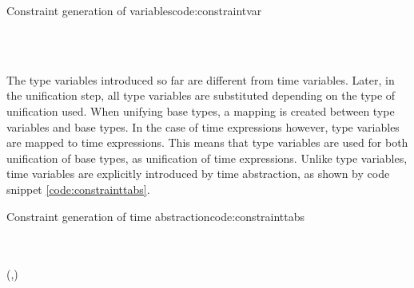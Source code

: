 \begin{texexptitled}{Constraint generation of variables}{code:constraintvar}
\begin{hscode}\SaveRestoreHook
{}%
%
%
%
%
%
\>[5]{}\;\to {}\<[E]%
\\
\>[5]{}\<[9]%
\>[9]{}\;{}\<[13]%
\>[13]{}\<[21]%
\>[21]{}\leftarrow{}\;\;\<[E]%
\\
\>[13]{}\;\<[E]%
\ColumnHook
\end{hscode}\resethooks
\end{texexptitled}

The type variables introduced so far are different from time variables.
Later, in the unification step, all type variables are substituted depending on the type of unification used.
When unifying base types, a mapping is created between type variables and base types.
In the case of time expressions however, type variables are mapped to time expressions.
This means that type variables are used for both unification of base types, as unification of time expressions.
Unlike type variables, time variables are explicitly introduced by time abstraction, as shown by code snippet \ref{code:constrainttabs}.

\begin{texexptitled}{Constraint generation of time abstraction}{code:constrainttabs}
\begin{hscode}\SaveRestoreHook
{}%
%
%
%
%
%
\>[5]{}\;\;\to {}\<[E]%
\\
\>[5]{}\<[9]%
\>[9]{}\;{}\<[13]%
\>[13]{}\<[21]%
\>[21]{}\leftarrow{}\<[E]%
\\
\>[13]{}\;(,){}\<[E]%
\\
\>[13]{}\;\<[E]%
\ColumnHook
\end{hscode}\resethooks
\end{texexptitled}

